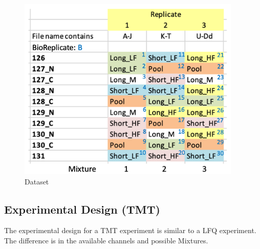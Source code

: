 \begin{figure}[htbp]
  \centering
  \includegraphics[width=0.95\textwidth]{graphics/isobaric/Dataset_MSstatsTMT.png}
  \caption{Dataset}
  \label{fig:isobaric_dataset_plubell}
\end{figure}

\subsection{Experimental Design (TMT)}
The experimental design for a TMT experiment is similar to a LFQ experiment. The difference is in the available channels and possible Mixtures. 

